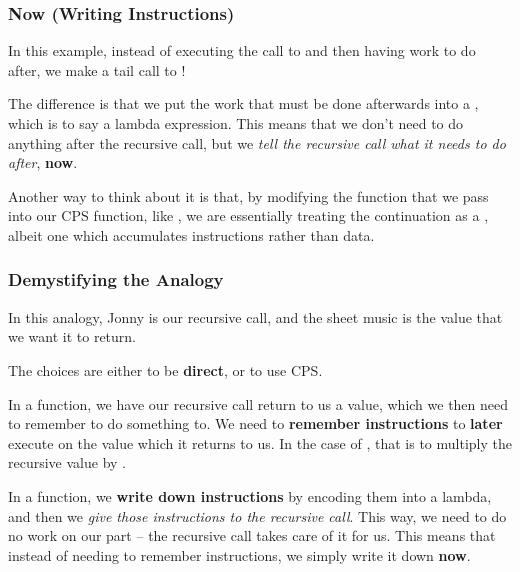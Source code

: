 \documentclass[aspectratio=169, handout]{beamer}
\begin{document}
\begin{frame}[fragile]
  \frametitle{Now (Writing Instructions)}

  In this example, instead of executing the call to 
  and then having work to do after, we make a tail call to !

  \pause
  \vspace{\fill}

  The difference is that we put the work that must be done afterwards
  into a , which is to say a lambda expression. This
  means that we don't need to do anything after the recursive call, but
  we \textit{tell the recursive call what it needs to do after}, \textbf{now}.

  \pause
  \vspace{\fill}

  Another way to think about it is that, by modifying the function that
  we pass into our CPS function, like , we are essentially
  treating the continuation as a , albeit
  one which accumulates instructions rather than data.
\end{frame}

\begin{frame}[fragile]
  \frametitle{Demystifying the Analogy}

  In this analogy, Jonny is our recursive call, and the sheet music is the
  value that we want it to return.

  \pause
  \vspace{\fill}

  The choices are either to be \textbf{direct}, or to use CPS.

  \pause
  \vspace{\fill}

  In a  function, we have our recursive call return to us a value,
  which we then need to remember to do something to. We need to \textbf{remember
  instructions} to \textbf{later} execute on the value which it returns to us.
  In the case of , that is to multiply the recursive value by .

  \pause
  \vspace{\fill}

  In a  function, we \textbf{write down instructions} by encoding them into
  a lambda, and then we \textit{give those instructions to the recursive call}.
  This way, we need to do no work on our part -- the recursive call takes care
  of it for us. This means that instead of needing to remember instructions,
  we simply write it down \textbf{now}.
\end{frame}
\end{document}

